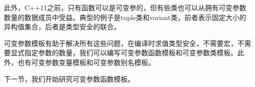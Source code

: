 此外，C++11之前，只有函数可以是可变参的，但有些类也可以从拥有可变参数数量的数据成员中受益。典型的例子是tuple类和variant类，前者表示固定大小的异构值集合，后者是类型安全的联合。

可变参数模板有助于解决所有这些问题，在编译时求值类型安全，不需要宏，不需要显式指定参数的数量，我们可以编写可变参数函数模板和可变参数类模板。此外，也有可变参数变量模板和可变参数别名模板。

下一节，我们开始研究可变参数函数模板。































